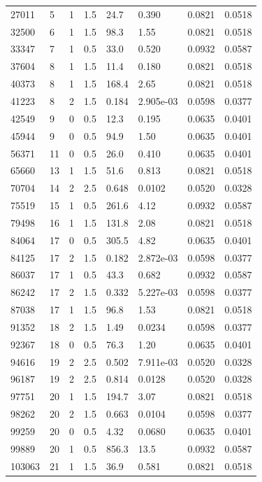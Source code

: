\documentclass[preview]{standalone}
\begin{document}
{{\begin{tabular}{L{1.2cm}C{1.2cm} C{0.3cm}C{0.5cm} C{1.4cm}C{1.4cm} C{1.4cm}C{1.4cm}}
  27011  &     5  & 1     & 1.5 &  24.7  & 0.390  & 0.0821 &  0.0518   \\ 
  32500  &     6  & 1     & 1.5 &  98.3  & 1.55  & 0.0821 &  0.0518   \\ 
  33347  &     7  & 1     & 0.5 &  33.0  & 0.520  & 0.0932 &  0.0587   \\ 
  37604  &     8  & 1     & 1.5 &  11.4  & 0.180  & 0.0821 &  0.0518   \\ 
  40373  &     8  & 1     & 1.5 &  168.4  & 2.65  & 0.0821 &  0.0518   \\ 
  41223  &     8  & 2     & 1.5 &  0.184  & 2.905e-03  & 0.0598 &  0.0377   \\ 
  42549  &     9  & 0     & 0.5 &  12.3  & 0.195  & 0.0635 &  0.0401   \\ 
  45944  &     9  & 0     & 0.5 &  94.9  & 1.50  & 0.0635 &  0.0401   \\ 
  56371  &    11  & 0     & 0.5 &  26.0  & 0.410  & 0.0635 &  0.0401   \\ 
  65660  &    13  & 1     & 1.5 &  51.6  & 0.813  & 0.0821 &  0.0518   \\ 
  70704  &    14  & 2     & 2.5 &  0.648  & 0.0102  & 0.0520 &  0.0328   \\ 
  75519  &    15  & 1     & 0.5 &  261.6  & 4.12  & 0.0932 &  0.0587   \\ 
  79498  &    16  & 1     & 1.5 &  131.8  & 2.08  & 0.0821 &  0.0518   \\ 
  84064  &    17  & 0     & 0.5 &  305.5  & 4.82  & 0.0635 &  0.0401   \\ 
  84125  &    17  & 2     & 1.5 &  0.182  & 2.872e-03  & 0.0598 &  0.0377   \\ 
  86037  &    17  & 1     & 0.5 &  43.3  & 0.682  & 0.0932 &  0.0587   \\ 
  86242  &    17  & 2     & 1.5 &  0.332  & 5.227e-03  & 0.0598 &  0.0377   \\ 
  87038  &    17  & 1     & 1.5 &  96.8  & 1.53  & 0.0821 &  0.0518   \\ 
  91352  &    18  & 2     & 1.5 &  1.49  & 0.0234  & 0.0598 &  0.0377   \\ 
  92367  &    18  & 0     & 0.5 &  76.3  & 1.20  & 0.0635 &  0.0401   \\ 
  94616  &    19  & 2     & 2.5 &  0.502  & 7.911e-03  & 0.0520 &  0.0328   \\ 
  96187  &    19  & 2     & 2.5 &  0.814  & 0.0128  & 0.0520 &  0.0328   \\ 
  97751  &    20  & 1     & 1.5 &  194.7  & 3.07  & 0.0821 &  0.0518   \\ 
  98262  &    20  & 2     & 1.5 &  0.663  & 0.0104  & 0.0598 &  0.0377   \\ 
  99259  &    20  & 0     & 0.5 &  4.32  & 0.0680  & 0.0635 &  0.0401   \\ 
  99889  &    20  & 1     & 0.5 &  856.3  & 13.5  & 0.0932 &  0.0587   \\ 
  103063  &    21  & 1     & 1.5 &  36.9  & 0.581  & 0.0821 &  0.0518   \\ 
\hline 
\end{tabular} 

}}
\end{document}
